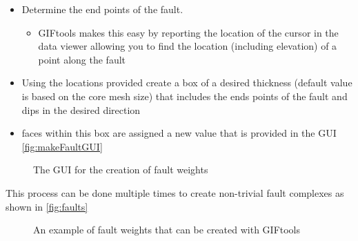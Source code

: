 \begin{itemize}
\item Determine the end points of the fault.
\begin{itemize}
	\item GIFtools makes this easy by reporting the location of the cursor in the data viewer allowing you to find the location (including elevation) of a point along the fault
\end{itemize}
\item Using the locations provided create a box of a desired thickness (default value is based on the core mesh size) that includes the ends points of the fault and dips in the desired direction
\item faces within this box are assigned a new value that is provided in the GUI \autoref{fig:makeFaultGUI}
\end{itemize}

\begin{figure} [h]
    \centering
    \caption{The GUI for the creation of fault weights}
    \label{fig:makeFaultGUI}
\end{figure}

This process can be done multiple times to create non-trivial fault complexes as shown in \autoref{fig:faults}

\begin{figure} [h]
    \centering
    \caption{An example of fault weights that can be created with GIFtools}
    \label{fig:faults}
\end{figure}
\FloatBarrier

